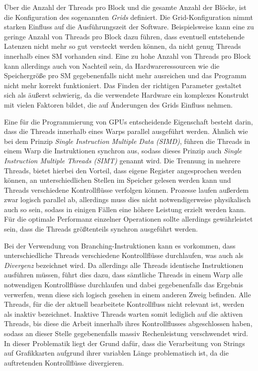 Über die Anzahl der Threads pro Block und die gesamte Anzahl der Blöcke, ist die Konfiguration des sogenannten \emph{Grids} definiert.
Die Grid-Konfiguration nimmt starken Einfluss auf die Ausführungszeit der Software.
Beispielsweise kann eine zu geringe Anzahl von Threads pro Block dazu führen, dass eventuell entstehende Latenzen nicht mehr so gut versteckt werden können, da nicht genug Threads innerhalb eines SM vorhanden sind.
Eine zu hohe Anzahl von Threads pro Block kann allerdings auch von Nachteil sein, da Hardwareressourcen wie die Speichergröße pro SM gegebenenfalls nicht mehr ausreichen und das Programm nicht mehr korrekt funktioniert.
Das Finden der richtigen Parameter gestaltet sich als äußerst schwierig, da die verwendete Hardware ein komplexes Konstrukt mit vielen Faktoren bildet, die auf Änderungen des Grids Einfluss nehmen.

Eine für die Programmierung von GPUs entscheidende Eigenschaft besteht darin, dass die Threads innerhalb eines Warps parallel ausgeführt werden.
Ähnlich wie bei dem Prinzip \emph{Single Instruction Multiple Data (SIMD)}, führen die Threads in einem Warp die Instruktionen synchron aus, sodass dieses Prinzip auch \emph{Single Instruction Multiple Threads (SIMT)} genannt wird.
Die Trennung in mehrere Threads, bietet hierbei den Vorteil, dass eigene Register angesprochen werden können, an unterschiedlichen Stellen im Speicher gelesen werden kann und Threads verschiedene Kontrollflüsse verfolgen können.
Prozesse laufen außerdem zwar logisch parallel ab, allerdings muss dies nicht notwendigerweise physikalisch auch so sein, sodass in einigen Fällen eine höhere Leistung erzielt werden kann.
Für die optimale Performanz einzelner Operationen sollte allerdings gewährleistet sein, dass die Threads größtenteils synchron ausgeführt werden.

Bei der Verwendung von Branching-Instruktionen kann es vorkommen, dass unterschiedliche Threads verschiedene Kontrollflüsse durchlaufen, was auch als \emph{Divergenz} bezeichnet wird.
Da allerdings alle Threads identische Instruktionen ausführen müssen, führt dies dazu, dass sämtliche Threads in einem Warp alle notwendigen Kontrollflüsse durchlaufen und dabei gegebenenfalls das Ergebnis verwerfen, wenn diese sich logisch gesehen in einem anderen Zweig befinden.
Alle Threads, für die der aktuell bearbeitete Kontrollfluss nicht relevant ist, werden als inaktiv bezeichnet.
Inaktive Threads warten somit lediglich auf die aktiven Threads, bis diese die Arbeit innerhalb ihres Kontrollflusses abgeschlossen haben, sodass an dieser Stelle gegebenenfalls massiv Rechenleistung verschwendet wird.
In dieser Problematik liegt der Grund dafür, dass die Verarbeitung von Strings auf Grafikkarten aufgrund ihrer variablen Länge problematisch ist, da die auftretenden Kontrollflüsse divergieren.


